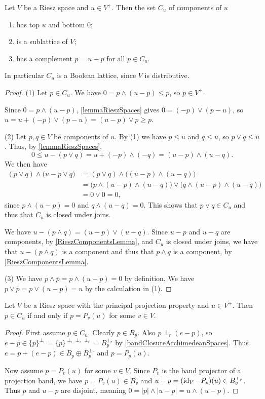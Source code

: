 \begin{proposition}
Let $V$ be a Riesz space and $u\in V^+$. Then the set $C_u$ of components of $u$
\begin{enumerate}
\item has top $u$ and bottom $0$;
\item is a sublattice of $V$;
\item has a complement $\overline{p} = u-p$ for all $p\in C_u$.
\end{enumerate}
In particular $C_u$ is a Boolean lattice, since $V$ is distributive.
\end{proposition}
\begin{proof}
(1) Let $p\in C_u$. We have $0 = p\wedge (u-p) \leq p$, so $p\in V^+$.

Since $0 = p\wedge (u-p)$, \ref{lemmaRieszSpaces} gives $0 = (-p)\vee (p-u)$, so $u = u+(-p)\vee (p-u) = (u-p)\vee p \geq p$.

(2) Let $p,q\in V$ be components of $u$. By (1) we have $p\leq u$ and $q\leq u$, so $p\vee q \leq u$. Thus, by \ref{lemmaRieszSpaces},
\[ 0 \leq u - (p\vee q) = u + (-p)\wedge(-q) = (u-p)\wedge (u-q). \]
We then have
\begin{align*}
(p\vee q)\wedge \big(u - p\vee q\big) &= (p\vee q)\wedge \big((u-p)\wedge (u-q)\big) \\
&= \big(p \wedge (u-p)\wedge (u-q)\big)\vee \big(q\wedge (u-p)\wedge (u-q)\big) \\
&= 0\vee 0 = 0,
\end{align*}
since $p \wedge (u-p) = 0$ and $q \wedge (u-q) = 0$. This shows that $p\vee q\in C_u$ and thus that $C_u$ is closed under joins.

We have $u - (p\wedge q) = (u-p)\vee (u-q)$. Since $u-p$ and $u-q$ are components, by \ref{RieszComponentsLemma}, and $C_u$ is closed under joins, we have that $u - (p\wedge q)$ is a component and thus that $p\wedge q$ is a component, by \ref{RieszComponentsLemma}.

(3) We have $p\wedge \overline{p} = p\wedge (u-p) = 0$ by definition. We have $p\vee \overline{p} = p\vee (u-p) = u$ by the calculation in (1).
\end{proof}

\begin{proposition}
Let $V$ be a Riesz space with the principal projection property and $u\in V^+$. Then $p\in C_u$ \textup{if and only if} $p = P_v(u)$ for some $v\in V$.
\end{proposition}
\begin{proof}
First assume $p\in C_u$. Clearly $p\in B_p$. Also $p\perp_r(e-p)$, so $e-p \in \{p\}^{\perp_r} = \{p\}^{\perp_r\perp_r\perp_r} = B_p^{\perp_r}$ by \ref{bandClosureArchimedeanSpaces}. Thus $e = p + (e-p) \in B_p\oplus B_p^{\perp_r}$ and $p = P_p(u)$.

Now assume $p = P_v(u)$ for some $v\in V$. Since $P_v$ is the band projector of a projection band, we have $p = P_v(u) \in B_v$ and $u-p = (\operatorname{id}_V- P_v)(u) \in B_v^{\perp_r}$. Thus $p$ and $u-p$ are disjoint, meaning $0 = |p|\wedge |u-p| = u\wedge (u-p)$.
\end{proof}

